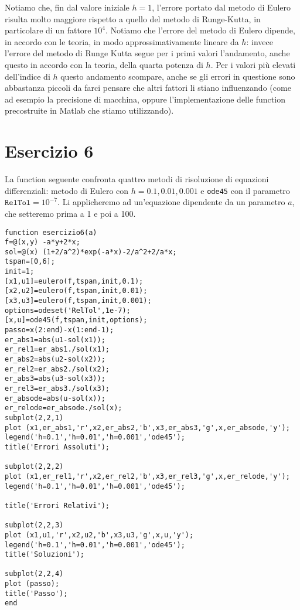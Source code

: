\documentclass{article}
\begin{document}
\par \bigskip

\noindent
Notiamo che, fin dal valore iniziale $h=1$, l'errore portato dal metodo di Eulero risulta molto maggiore rispetto a quello del metodo di Runge-Kutta, in particolare di un fattore $10^4$. Notiamo che l'errore del metodo di Eulero dipende, in accordo con le teoria, in modo approssimativamente lineare da $h$: invece l'errore del metodo di Runge Kutta segue per i primi valori l'andamento, anche questo in accordo con la teoria, della quarta potenza di $h$. Per i valori più elevati dell'indice di $h$ questo andamento scompare, anche se gli errori in questione sono abbastanza piccoli da farci pensare che altri fattori li stiano influenzando (come ad esempio la precisione di macchina, oppure l'implementazione delle function precostruite in Matlab che stiamo utilizzando).

\newpage

\section*{Esercizio 6}
La function seguente confronta quattro metodi di risoluzione di equazioni differenziali: metodo di Eulero con $h=0.1, 0.01, 0.001$ e \texttt{ode45} con il parametro $\texttt{RelTol}=10^{-7}$. Li applicheremo ad un'equazione dipendente da un parametro $a$, che setteremo prima a 1 e poi a 100.
\begin{lstlisting}
function esercizio6(a)
f=@(x,y) -a*y+2*x;
sol=@(x) (1+2/a^2)*exp(-a*x)-2/a^2+2/a*x;
tspan=[0,6];
init=1;
[x1,u1]=eulero(f,tspan,init,0.1);
[x2,u2]=eulero(f,tspan,init,0.01);
[x3,u3]=eulero(f,tspan,init,0.001);
options=odeset('RelTol',1e-7);
[x,u]=ode45(f,tspan,init,options);
passo=x(2:end)-x(1:end-1);
er_abs1=abs(u1-sol(x1));
er_rel1=er_abs1./sol(x1);
er_abs2=abs(u2-sol(x2));
er_rel2=er_abs2./sol(x2);
er_abs3=abs(u3-sol(x3));
er_rel3=er_abs3./sol(x3);
er_absode=abs(u-sol(x));
er_relode=er_absode./sol(x);
subplot(2,2,1) 
plot (x1,er_abs1,'r',x2,er_abs2,'b',x3,er_abs3,'g',x,er_absode,'y');
legend('h=0.1','h=0.01','h=0.001','ode45');
title('Errori Assoluti');

subplot(2,2,2) 
plot (x1,er_rel1,'r',x2,er_rel2,'b',x3,er_rel3,'g',x,er_relode,'y');
legend('h=0.1','h=0.01','h=0.001','ode45');

title('Errori Relativi');

subplot(2,2,3)
plot (x1,u1,'r',x2,u2,'b',x3,u3,'g',x,u,'y');
legend('h=0.1','h=0.01','h=0.001','ode45');
title('Soluzioni');

subplot(2,2,4) 
plot (passo);
title('Passo');
end
\end{lstlisting}
\end{document}
